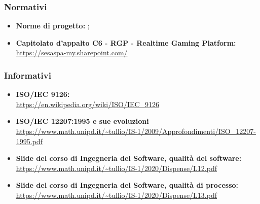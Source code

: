		\subsubsection{Normativi}
		\begin{itemize}
			\item \textbf{Norme di progetto:} ;
			\item \textbf{Capitolato d’appalto C6 - RGP - Realtime Gaming Platform:}\\
			\href{https://sesaspa-my.sharepoint.com/personal/s_dindo_vargroup_it/_layouts/15/onedrive.aspx?id=%2Fpersonal%2Fs%5Fdindo%5Fvargroup%5Fit%2FDocuments%2FDownload%2Fupload%2FIngegneria%5Fsoftware%2FCapitolato%5FIngegneria%5Fsoftware%2Epdf&parent=%2Fpersonal%2Fs%5Fdindo%5Fvargroup%5Fit%2FDocuments%2FDownload%2Fupload%2FIngegneria%5Fsoftware&originalPath=aHR0cHM6Ly9zZXNhc3BhLW15LnNoYXJlcG9pbnQuY29tLzpiOi9nL3BlcnNvbmFsL3NfZGluZG9fdmFyZ3JvdXBfaXQvRVRodmF5MGY2S1ZDb1h5ZFlPY2UybGtCdC1NWWNuVzF5YWZSWEZYVklPSXNIZz9ydGltZT1jQjNzY3NxczJFZw}{https://sesaspa-my.sharepoint.com/}
		\end{itemize}
		\subsubsection{Informativi}
		\begin{itemize}
			\item \textbf{ISO/IEC 9126:}\\
			\url{https://en.wikipedia.org/wiki/ISO/IEC_9126}
			
			\item \textbf{ISO/IEC 12207:1995 e sue evoluzioni}\\
			\url{https://www.math.unipd.it/~tullio/IS-1/2009/Approfondimenti/ISO_12207-1995.pdf}
			
			\item \textbf{Slide del corso di Ingegneria del Software, qualità del software:}\\
			\url{https://www.math.unipd.it/~tullio/IS-1/2020/Dispense/L12.pdf}
			
			\item \textbf{Slide del corso di Ingegneria del Software, qualità di processo:}\\
			\url{https://www.math.unipd.it/~tullio/IS-1/2020/Dispense/L13.pdf}
		
		\end{itemize}
	